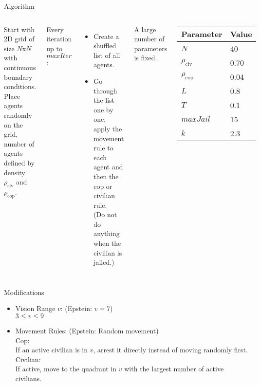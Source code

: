 \documentclass[red]{beamer}
\begin{document}
\begin{frame}{Algorithm}
  \begin{columns}
    \column{3.0in}
    Start with 2D grid of size $N$x$N$ with continuous boundary conditions.
    Place agents randomly on the grid, number of agents defined by density $\rho_{\text{civ}}$ and $\rho_{\text{cop}}$.

    Every iteration up to $maxIter$:
    \begin{itemize}
    \item
      Create a shuffled list of all agents.
    \item
      Go through the list one by one, apply the movement rule to each agent and then the cop or civilian rule.\\
      (Do not do anything when the civilian is jailed.)
    \end{itemize}

    A large number of parameters is fixed.

    \column{1.5in}

    \begin{table}[H]
      \centering
      \begin{tabular}{l | l}
        Parameter & Value \\
        \hline
        $N$ & 40 \\
        $\rho_{\text{civ}}$ & 0.70 \\
        $\rho_{\text{cop}} $ & 0.04 \\
        $L$ & 0.8 \\
        $T$ & 0.1 \\
        $maxJail$ & 15 \\
        $k$ & 2.3 \\
      \end{tabular}
      \label{tab:param}
    \end{table}
  \end{columns}

\end{frame}

\begin{frame}{Modifications}
  \begin{itemize}
  \item
    Vision Range $v$: (Epstein: $v = 7$)\\
    $ 3 \leq v \leq 9$
  \vspace{10pt}
  \item
    Movement Rules: (Epstein: Random movement)\\
    \vspace{10pt}
    Cop: \\
    If an active civilian is in $v$, arrest it directly instead of moving randomly first. \\
    \vspace{10pt}
    Civilian: \\
    If active, move to the quadrant in $v$ with the largest number of active civilians.
  \end{itemize}
\end{frame}
\end{document}
